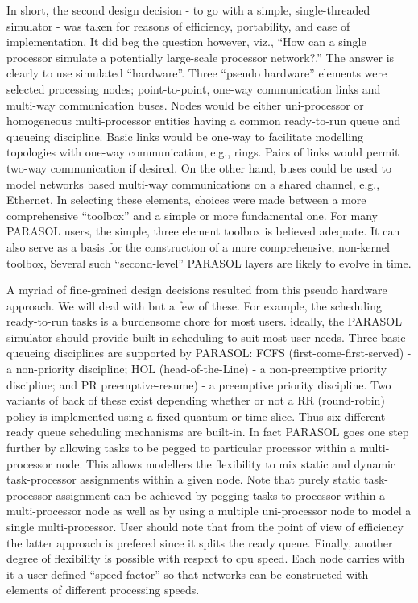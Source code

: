 \documentclass[11pt]{article}
\begin{document}
In short, the second design decision - to go with a simple, single-threaded simulator - was taken
for reasons of efficiency, portability, and ease of implementation, It did beg the question however,
viz., ``How can a single processor simulate a potentially large-scale processor network?.'' The
answer is clearly to use simulated ``hardware''. Three ``pseudo hardware'' elements were selected
processing nodes; point-to-point, one-way communication links and multi-way communication
buses. Nodes would be either uni-processor or homogeneous multi-processor entities having a
common ready-to-run queue and queueing discipline. Basic links would be one-way to facilitate
modelling topologies with one-way communication, e.g., rings. Pairs of links would permit
two-way communication if desired. On the other hand, buses could be used to model networks
based multi-way communications on a shared channel, e.g., Ethernet. In selecting these elements,
choices were made between a more comprehensive ``toolbox'' and a simple or more fundamental
one. For many PARASOL users, the simple, three element toolbox is believed adequate. It can
also serve as a basis for the construction of a more comprehensive, non-kernel toolbox, Several
such ``second-level'' PARASOL layers are likely to evolve in time.

A myriad of fine-grained design decisions resulted from this pseudo hardware approach. We will
deal with but a few of these. For example, the scheduling ready-to-run tasks is a burdensome
chore for most users. ideally, the PARASOL simulator should provide built-in scheduling to suit
most user needs.  Three basic queueing disciplines are supported by PARASOL: FCFS
(first-come-first-served) - a non-priority discipline; HOL (head-of-the-Line) - a non-preemptive
priority discipline; and PR preemptive-resume) - a preemptive priority discipline. Two variants of
back of these exist depending whether or not a RR (round-robin) policy is implemented using a
fixed quantum or time slice. Thus six different ready queue scheduling mechanisms are built-in.
In fact PARASOL goes one step further by allowing tasks to be pegged to particular processor
within a multi-processor node. This allows modellers the flexibility to mix static and dynamic
task-processor assignments within a given node. Note that purely static task-processor assignment
can be achieved by pegging tasks to processor within a multi-processor node as well as by using a
multiple uni-processor node to model a single multi-processor. User should note that from the
point of view of efficiency the latter approach is prefered since it splits the ready queue. Finally,
another degree of flexibility is possible with respect to cpu speed. Each node carries with it a user
defined  ``speed factor'' so that networks can be constructed with elements of different processing
speeds.
\end{document}
